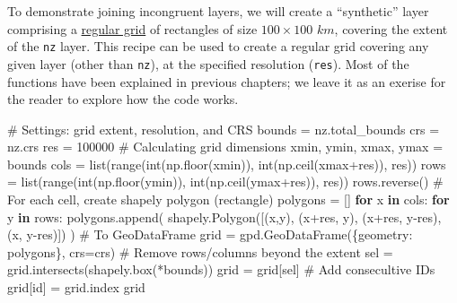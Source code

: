 \documentclass[
  letterpaper,
]{krantz}
\newenvironment{Shaded}{\begin{snugshade}}{\end{snugshade}}
\newcommand{\BuiltInTok}[1]{\textcolor[rgb]{0.00,0.23,0.31}{#1}}
\newcommand{\CommentTok}[1]{\textcolor[rgb]{0.37,0.37,0.37}{#1}}
\newcommand{\ControlFlowTok}[1]{\textcolor[rgb]{0.00,0.23,0.31}{\textbf{#1}}}
\newcommand{\DecValTok}[1]{\textcolor[rgb]{0.68,0.00,0.00}{#1}}
\newcommand{\KeywordTok}[1]{\textcolor[rgb]{0.00,0.23,0.31}{\textbf{#1}}}
\newcommand{\NormalTok}[1]{\textcolor[rgb]{0.00,0.23,0.31}{#1}}
\newcommand{\OperatorTok}[1]{\textcolor[rgb]{0.37,0.37,0.37}{#1}}
\newcommand{\StringTok}[1]{\textcolor[rgb]{0.13,0.47,0.30}{#1}}
\begin{document}
To demonstrate joining incongruent layers, we will create a
``synthetic'' layer comprising a
\href{https://gis.stackexchange.com/questions/322589/rasterizing-polygon-grid-in-python-geopandas-rasterio}{regular
grid} of rectangles of size \(100\times100\) \(km\), covering the extent
of the \texttt{nz} layer. This recipe can be used to create a regular
grid covering any given layer (other than \texttt{nz}), at the specified
resolution (\texttt{res}). Most of the functions have been explained in
previous chapters; we leave it as an exerise for the reader to explore
how the code works.

\begin{Shaded}
\begin{Highlighting}[]
\CommentTok{\# Settings: grid extent, resolution, and CRS}
\NormalTok{bounds }\OperatorTok{=}\NormalTok{ nz.total\_bounds}
\NormalTok{crs }\OperatorTok{=}\NormalTok{ nz.crs}
\NormalTok{res }\OperatorTok{=} \DecValTok{100000}
\CommentTok{\# Calculating grid dimensions}
\NormalTok{xmin, ymin, xmax, ymax }\OperatorTok{=}\NormalTok{ bounds}
\NormalTok{cols }\OperatorTok{=} \BuiltInTok{list}\NormalTok{(}\BuiltInTok{range}\NormalTok{(}\BuiltInTok{int}\NormalTok{(np.floor(xmin)), }\BuiltInTok{int}\NormalTok{(np.ceil(xmax}\OperatorTok{+}\NormalTok{res)), res))}
\NormalTok{rows }\OperatorTok{=} \BuiltInTok{list}\NormalTok{(}\BuiltInTok{range}\NormalTok{(}\BuiltInTok{int}\NormalTok{(np.floor(ymin)), }\BuiltInTok{int}\NormalTok{(np.ceil(ymax}\OperatorTok{+}\NormalTok{res)), res))}
\NormalTok{rows.reverse()}
\CommentTok{\# For each cell, create \textquotesingle{}shapely\textquotesingle{} polygon (rectangle)}
\NormalTok{polygons }\OperatorTok{=}\NormalTok{ []}
\ControlFlowTok{for}\NormalTok{ x }\KeywordTok{in}\NormalTok{ cols:}
    \ControlFlowTok{for}\NormalTok{ y }\KeywordTok{in}\NormalTok{ rows:}
\NormalTok{        polygons.append(}
\NormalTok{            shapely.Polygon([(x,y), (x}\OperatorTok{+}\NormalTok{res, y), (x}\OperatorTok{+}\NormalTok{res, y}\OperatorTok{{-}}\NormalTok{res), (x, y}\OperatorTok{{-}}\NormalTok{res)])}
\NormalTok{        )}
\CommentTok{\# To \textquotesingle{}GeoDataFrame\textquotesingle{}}
\NormalTok{grid }\OperatorTok{=}\NormalTok{ gpd.GeoDataFrame(\{}\StringTok{\textquotesingle{}geometry\textquotesingle{}}\NormalTok{: polygons\}, crs}\OperatorTok{=}\NormalTok{crs)}
\CommentTok{\# Remove rows/columns beyond the extent}
\NormalTok{sel }\OperatorTok{=}\NormalTok{ grid.intersects(shapely.box(}\OperatorTok{*}\NormalTok{bounds))}
\NormalTok{grid }\OperatorTok{=}\NormalTok{ grid[sel]}
\CommentTok{\# Add consecultive IDs}
\NormalTok{grid[}\StringTok{\textquotesingle{}id\textquotesingle{}}\NormalTok{] }\OperatorTok{=}\NormalTok{ grid.index}
\NormalTok{grid}
\end{Highlighting}
\end{Shaded}
\end{document}
